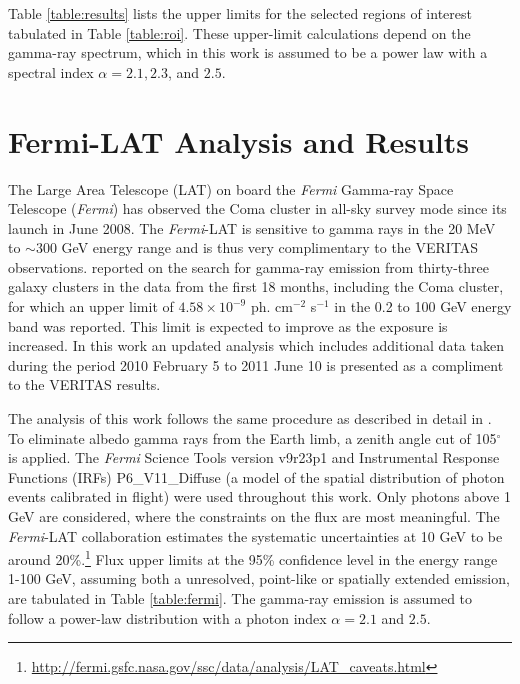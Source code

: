 \documentclass[12pt,manuscript]{aastex}
\begin{document}
Table \ref{table:results} lists the upper limits for the selected regions of interest tabulated in Table \ref{table:roi}. These upper-limit calculations depend on the gamma-ray spectrum, which in this work is assumed to be a power law with a spectral index $\alpha=2.1, 2.3$, and $2.5$.

\section{Fermi-LAT Analysis and Results}
The Large Area Telescope (LAT) on board the \emph{Fermi} Gamma-ray Space Telescope (\emph{Fermi}) has observed the Coma cluster in all-sky survey mode since its launch in June 2008. The \emph{Fermi}-LAT is sensitive to gamma rays in the 20 MeV to $\sim$300 GeV energy range and is thus very complimentary to the VERITAS observations. \citet{article:Ackermann_etal:2010} reported on the search for gamma-ray emission from thirty-three galaxy clusters in the data from the first 18 months, including the Coma cluster, for which an upper limit of $4.58\times 10^{-9}$ ph. cm$^{-2}$ s$^{-1}$ in the 0.2 to 100 GeV energy band was reported. This limit is expected to improve as the exposure is increased. In this work an updated analysis which includes additional data taken during the period 2010 February 5 to 2011 June 10 is presented as a compliment to the VERITAS results.

The analysis of this work follows the same procedure as described in detail in \citet{article:Abdo_etal:2009}. To eliminate albedo gamma rays from the Earth limb, a zenith angle cut of 105$^{\circ}$ is applied. The \emph{Fermi} Science Tools version v9r23p1 and Instrumental Response Functions (IRFs) P6\_V11\_Diffuse (a model of the spatial distribution of photon events calibrated  in flight) were used throughout this work. Only photons above 1 GeV are considered, where the constraints on the flux are most meaningful. The \emph{Fermi}-LAT collaboration estimates the systematic uncertainties at 10 GeV to be around 20\%.\footnote{\url{http://fermi.gsfc.nasa.gov/ssc/data/analysis/LAT\_caveats.html}} Flux upper limits at the 95\% confidence level in the energy range 1-100 GeV, assuming both a unresolved, point-like or spatially extended emission, are tabulated in Table \ref{table:fermi}. The gamma-ray emission is assumed to follow a power-law distribution with a photon index $\alpha=2.1$ and $2.5$.
\end{document}
